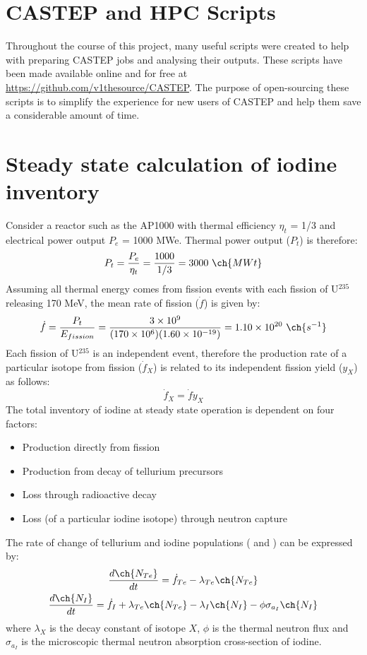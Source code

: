 \documentclass[a4paper,12pt,twoside]{report}
\begin{document}
\chapter{CASTEP and HPC Scripts}
\label{castep_scripts}

Throughout the course of this project, many useful scripts were created to help with preparing CASTEP jobs and analysing their outputs. These scripts have been made available online and for free at \href{https://github.com/v1thesource/CASTEP}{https://github.com/v1thesource/CASTEP}. The purpose of open-sourcing these scripts is to simplify the experience for new users of CASTEP and help them save a considerable amount of time.

\chapter{Steady state calculation of iodine inventory}

Consider a reactor such as the AP1000 with thermal efficiency $\eta_{t}$ = 1/3 and electrical power output $P_{e}$ = 1000 MWe. Thermal power output ($P_{t}$) is therefore:
\begin{equation}
P_{t} = \frac{P_{e}}{\eta_{t}} = \frac{1000}{1/3} = 3000 \ \ch{MWt}
\end{equation}
Assuming all thermal energy comes from fission events with each fission of U$^{235}$ releasing 170 MeV, the mean rate of fission ($\dot{f}$) is given by:
\begin{equation}
\dot{f} = \frac{P_{t}}{E_{fission}} = \frac{3 \times 10^{9}}{(170 \times 10^{6})(1.60 \times 10^{-19})} = 1.10 \times 10^{20} \ \ch{s^{-1}}
\end{equation}
Each fission of U$^{235}$ is an independent event, therefore the production rate of a particular isotope from fission ($\dot{f}_{X}$) is related to its independent fission yield ($y_{X}$) as follows:
\begin{equation}
\dot{f}_{X} = \dot{f}y_{X}
\end{equation}
The total inventory of iodine at steady state operation is dependent on four factors:
\begin{itemize}
\item Production directly from fission
\item Production from decay of tellurium precursors
\item Loss through radioactive decay
\item Loss (of a particular iodine isotope) through neutron capture
\end{itemize}
The rate of change of tellurium and iodine populations ( and ) can be expressed by:
\begin{gather}
\frac{d\ch{N_{Te}}}{dt} = \dot{f}_{Te} - \lambda_{Te}\ch{N_{Te}} \\
\frac{d\ch{N_{I}}}{dt} = \dot{f}_{I} + \lambda_{Te}\ch{N_{Te}} - \lambda_{I}\ch{N_{I}} - \phi\sigma_{a_{I}}\ch{N_{I}}
\end{gather}
where $\lambda_{X}$ is the decay constant of isotope $X$, $\phi$ is the thermal neutron flux and $\sigma_{a_{I}}$ is the microscopic thermal neutron absorption cross-section of iodine.
\end{document}
